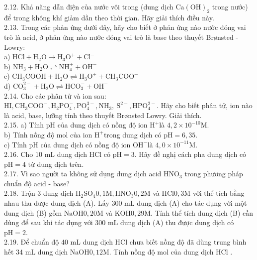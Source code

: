 \documentclass[10pt]{article}
\begin{document}
2.12. Khả năng dẫn điện của nước vôi trong (dung dịch $\mathrm{Ca}(\mathrm{OH})_{2}$ trong nước) để trong không khí giảm dần theo thời gian. Hãy giải thích điều này.\\
2.13. Trong các phản ứng dưới đây, hãy cho biết ở phản ứng nào nước đóng vai trò là acid, ở phản ứng nào nước đóng vai trò là base theo thuyết Brønsted - Lowry:\\
a) $\mathrm{HCl}+\mathrm{H}_{2} \mathrm{O} \rightarrow \mathrm{H}_{3} \mathrm{O}^{+}+\mathrm{Cl}^{-}$\\
b) $\mathrm{NH}_{3}+\mathrm{H}_{2} \mathrm{O} \rightleftharpoons \mathrm{NH}_{4}^{+}+\mathrm{OH}^{-}$\\
c) $\mathrm{CH}_{3} \mathrm{COOH}+\mathrm{H}_{2} \mathrm{O} \rightleftharpoons \mathrm{H}_{3} \mathrm{O}^{+}+\mathrm{CH}_{3} \mathrm{COO}^{-}$\\
d) $\mathrm{CO}_{3}^{2-}+\mathrm{H}_{2} \mathrm{O} \rightleftharpoons \mathrm{HCO}_{3}^{-}+\mathrm{OH}^{-}$\\
2.14. Cho các phân tử và ion sau: $\mathrm{HI}, \mathrm{CH}_{3} \mathrm{COO}^{-}, \mathrm{H}_{2} \mathrm{PO}_{4}^{-}, \mathrm{PO}_{4}^{3-}, \mathrm{NH}_{3}, \mathrm{~S}^{2-}, \mathrm{HPO}_{4}^{2-}$. Hãy cho biết phân tử, ion nào là acid, base, lưỡng tính theo thuyết Brønsted Lowry. Giải thích.\\
2.15. a) Tính pH của dung dịch có nồng độ ion $\mathrm{H}^{+}$là $4,2 \times 10^{-10} \mathrm{M}$.\\
b) Tính nồng độ mol của ion $\mathrm{H}^{+}$trong dung dịch có $\mathrm{pH}=6,35$.\\
c) Tính pH của dung dịch có nồng độ ion $\mathrm{OH}^{-}$là $4,0 \times 10^{-11} \mathrm{M}$.\\
2.16. Cho 10 mL dung dịch HCl có $\mathrm{pH}=3$. Hãy đề nghị cách pha dung dịch có $\mathrm{pH}=4$ từ dung dịch trên.\\
2.17. Vì sao người ta không sử dụng dung dịch acid $\mathrm{HNO}_{3}$ trong phương pháp chuẩn độ acid - base?\\
2.18. Trộn 3 dung dịch $\mathrm{H}_{2} \mathrm{SO}_{4} 0,1 \mathrm{M}, \mathrm{HNO}_{3} 0,2 \mathrm{M}$ và $\mathrm{HCl} 0,3 \mathrm{M}$ với thể tích bằng nhau thu được dung dịch (A). Lấy 300 mL dung dịch (A) cho tác dụng với một dung dịch (B) gồm $\mathrm{NaOH} 0,20 \mathrm{M}$ và $\mathrm{KOH} 0,29 \mathrm{M}$. Tính thể tích dung dịch (B) cần dùng để sau khi tác dụng với 300 mL dung dịch (A) thu được dung dịch có $\mathrm{pH}=2$.\\
2.19. Để chuẩn độ 40 mL dung dịch HCl chưa biết nồng độ đã dùng trung bình hết 34 mL dung dịch $\mathrm{NaOH} 0,12 \mathrm{M}$. Tính nồng độ mol của dung dịch HCl .\\
\end{document}
